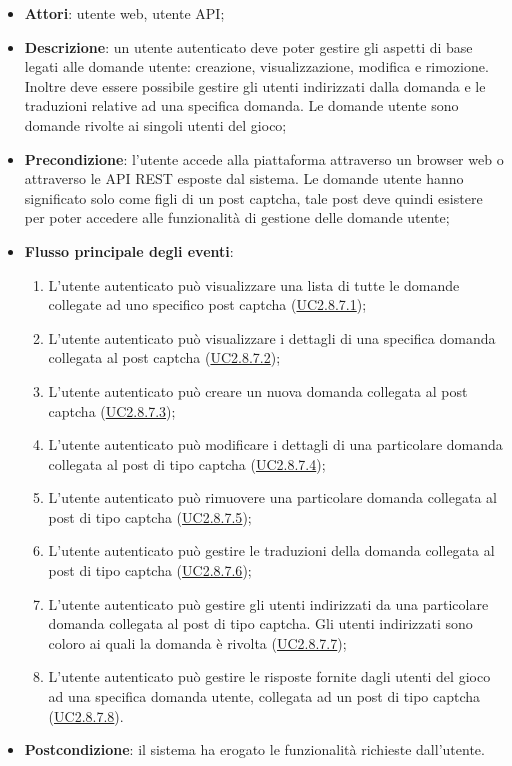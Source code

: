 \begin{itemize}
\item \textbf{Attori}: utente web, utente API;
\item \textbf{Descrizione}: un utente autenticato deve poter gestire gli aspetti di base legati alle domande utente: creazione, visualizzazione, modifica e rimozione.
Inoltre deve essere possibile gestire gli utenti indirizzati dalla domanda e le traduzioni relative ad una specifica domanda.
Le domande utente sono domande rivolte ai singoli utenti del gioco; 
      \item \textbf{Precondizione}: l'utente accede alla piattaforma attraverso un browser web o attraverso le API REST esposte dal sistema. Le domande utente hanno significato solo come figli di un post captcha, tale post deve quindi esistere per poter accedere alle funzionalità di gestione delle domande utente;

        \item \textbf{Flusso principale degli eventi}:
          \begin{enumerate}
          \item L'utente autenticato può visualizzare una lista di tutte le domande collegate ad uno specifico post captcha (\hyperlink{UC2.8.7.1}{UC2.8.7.1});
          \item L'utente autenticato può visualizzare i dettagli di una specifica domanda collegata al post captcha (\hyperlink{UC2.8.7.2}{UC2.8.7.2});
          \item L'utente autenticato può creare un nuova domanda collegata al post captcha (\hyperlink{UC2.8.7.3}{UC2.8.7.3});
          \item L'utente autenticato può modificare i dettagli di una particolare domanda collegata al post di tipo captcha (\hyperlink{UC2.8.7.4}{UC2.8.7.4});
          \item L'utente autenticato può rimuovere una particolare domanda collegata al post di tipo captcha (\hyperlink{UC2.8.7.5}{UC2.8.7.5});
          \item L'utente autenticato può gestire le traduzioni della domanda collegata al post di tipo captcha (\hyperlink{UC2.8.7.6}{UC2.8.7.6});
          \item L'utente autenticato può gestire gli utenti indirizzati da una particolare domanda collegata al post di tipo captcha. Gli utenti indirizzati sono coloro ai quali la domanda è rivolta (\hyperlink{UC2.8.7.7}{UC2.8.7.7});
          \item L'utente autenticato può gestire le risposte fornite dagli utenti del gioco ad una specifica domanda utente, collegata ad un post di tipo captcha (\hyperlink{UC2.8.7.8}{UC2.8.7.8}).

      \end{enumerate}
    \item \textbf{Postcondizione}: il sistema ha erogato le funzionalità richieste dall'utente.
  \end{itemize}
\hypertarget{UC2.8.7.1}{}
